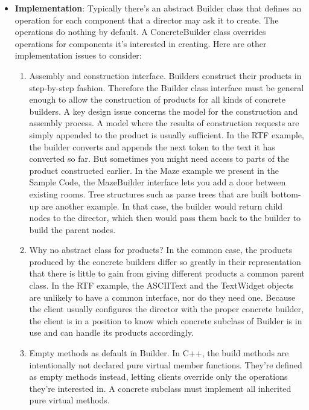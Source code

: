 \documentclass{report}
\begin{document}
\begin{itemize}
\begin{enumerate}
                \end{enumerate}
            \item \textbf{Implementation}:  Typically there's an abstract Builder class that defines an operation for each component that a director may ask it to create. The operations do nothing by default. A ConcreteBuilder class overrides operations for components it's interested in creating.
                \bigbreak \noindent 
                Here are other implementation issues to consider:
                \begin{enumerate}
                    \item Assembly and construction interface. Builders construct their products in step-by-step fashion. Therefore the Builder class interface must be general enough to allow the construction of products for all kinds of concrete builders.
                        \bigbreak \noindent 
                        A key design issue concerns the model for the construction and assembly process. A model where the results of construction requests are simply appended to the product is usually sufficient. In the RTF example, the builder converts and appends the next token to the text it has converted so far.
                        \bigbreak \noindent 
                        But sometimes you might need access to parts of the product constructed earlier. In the Maze example we present in the Sample Code, the MazeBuilder interface lets you add a door between existing rooms. Tree structures such as parse trees that are built bottom-up are another example. In that case, the builder would return child nodes to the director, which then would pass them back to the builder to build the parent nodes.
                    \item Why no abstract class for products? In the common case, the products produced by the concrete builders differ so greatly in their representation that there is little to gain from giving different products a common parent class. In the RTF example, the ASCIIText and the TextWidget objects are unlikely to have a common interface, nor do they need one. Because the client usually configures the director with the proper concrete builder, the client is in a position to know which concrete subclass of Builder is in use and can handle its products accordingly.
                    \item Empty methods as default in Builder. In C++, the build methods are intentionally not declared pure virtual member functions. They're defined as empty methods instead, letting clients override only the operations they're interested in. A concrete subclass must implement all inherited pure virtual methods.

\end{enumerate}
\end{itemize}
\end{document}
